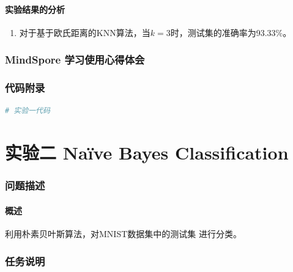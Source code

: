 \documentclass[12pt]{article}
\begin{document}
\subsection{实验结果的分析}

\begin{enumerate}
  \item 对于基于欧氏距离的KNN算法，当$k=3$时，测试集的准确率为93.33\%。
\end{enumerate}




\section{MindSpore 学习使用心得体会}

\section{代码附录}

\begin{lstlisting}[language=Python]
# 实验一代码
\end{lstlisting}

\newpage
\part{\centering 实验二 Na\"ive Bayes Classification}

\section{问题描述}
\subsection{概述}
利用朴素贝叶斯算法，对MNIST数据集中的测试集
进行分类。
\section{任务说明}
\end{document}
